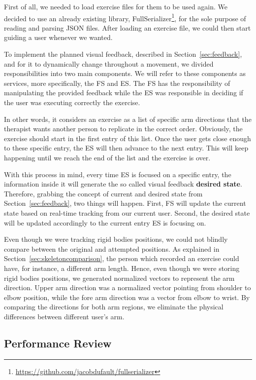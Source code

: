First of all, we needed to load exercise files for them to be used again. 
We decided to use an already existing library, FullSerializer\footnote{\url{https://github.com/jacobdufault/fullserializer}}, for the sole purpose of reading and parsing JSON files.
After loading an exercise file, we could then start guiding a user whenever we wanted.

To implement the planned visual feedback, described in Section~\ref{sec:feedback}, and for it to dynamically change throughout a movement, 
we divided responsibilities into two main components. We will refer to these components as services, more specifically, the \ac{FS} and \ac{ES}.
The \ac{FS} has the responsibility of manipulating the provided feedback while the \ac{ES} was responsible in deciding if the user was executing correctly the exercise.

In other words, it considers an exercise as a list of specific arm directions that the therapist wants another person to replicate in the correct order. 
Obviously, the exercise should start in the first entry of this list. 
Once the user gets close enough to these specific entry, the \ac{ES} will then advance to the next entry. 
This will keep happening until we reach the end of the list and the exercise is over.

With this process in mind, every time \ac{ES} is focused on a specific entry, the information inside it will generate the so called visual feedback \textbf{desired state}. 
Therefore, grabbing the concept of current and desired state from Section~\ref{sec:feedback}, two things will happen. 
First, \ac{FS} will update the current state based on real-time tracking from our current user. 
Second, the desired state will be updated accordingly to the current entry \ac{ES} is focusing on.

Even though we were tracking rigid bodies positions, we could not blindly compare between the original and attempted positions.
As explained in Section~\ref{sec:skeletoncomparison}, the person which recorded an exercise could have, for instance, a different arm length. Hence, even though we were storing rigid bodies positions, we generated normalized vectors to represent the arm direction. 
Upper arm direction was a normalized vector pointing from shoulder to elbow position, while the fore arm direction was a vector from elbow to wrist.
By comparing the directions for both arm regions, we eliminate the physical differences between different user's arm.

\subsection{Performance Review}

